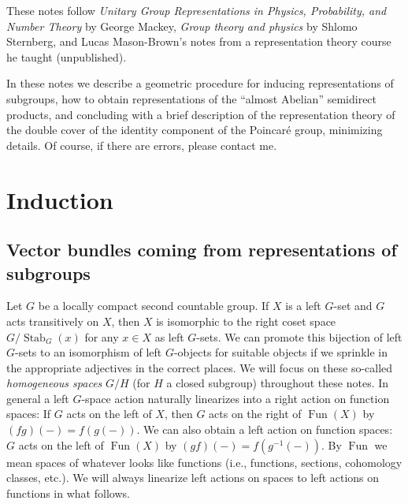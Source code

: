 \documentclass[11pt,leqno]{article}
\theoremstyle{plain}
\theoremstyle{definition}
\numberwithin{equation}{section}
\numberwithin{lem}{section}
\DeclareMathOperator{\Stab}{Stab}
\DeclareMathOperator{\Fun}{Fun}
\begin{document}
These notes follow \textit{Unitary Group Representations in Physics, Probability, and Number Theory} by George Mackey, \textit{Group theory and physics} by Shlomo Sternberg, and Lucas Mason-Brown's notes from a representation theory course he taught (unpublished).

In these notes we describe a geometric procedure for inducing representations of subgroups, how to obtain representations of the ``almost Abelian'' semidirect products, and concluding with a brief description of the representation theory of the double cover of the identity component of the Poincar\'e group, minimizing details. Of course, if there are errors, please contact me.

\section{Induction}
\subsection{Vector bundles coming from representations of subgroups}
Let $G$ be a locally compact second countable group. If $X$ is a left $G$-set and $G$ acts transitively on $X$, then $X$ is isomorphic to the right coset space $G/\Stab_G(x)$ for any $x\in X$ as left $G$-sets. We can promote this bijection of left $G$-sets to an isomorphism of left $G$-objects for suitable objects if we sprinkle in the appropriate adjectives in the correct places. We will focus on these so-called \textit{homogeneous spaces} $G/H$ (for $H$ a closed subgroup) throughout these notes. In general a left $G$-space action naturally linearizes into a right action on function spaces: If $G$ acts on the left of $X$, then $G$ acts on the right of $\Fun(X)$ by $(fg)(-) = f(g(-))$. We can also obtain a left action on function spaces: $G$ acts on the left of $\Fun(X)$ by $(gf)(-) = f(g^{-1}(-))$. By $\Fun$ we mean spaces of whatever looks like functions (i.e., functions, sections, cohomology classes, etc.). We will always linearize left actions on spaces to left actions on functions in what follows.
\end{document}
